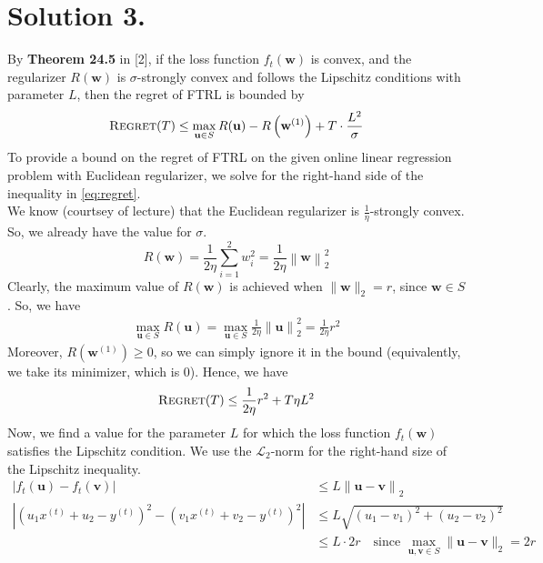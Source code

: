 \documentclass[11pt]{article}
\begin{document}
\section*{Solution 3.}
By \textbf{Theorem 24.5} in [2], if the loss function $f_{t}(\mathbf{w})$ is convex, and the
regularizer $R(\mathbf{w})$ is $\sigma$-strongly convex and follows the Lipschitz conditions
with parameter $L$, then the regret of FTRL is bounded by
\begin{equation}
    \label{eq:regret}
    \textsc{Regret}(T) \leq \max_{\mathbf{u} \in S} R(\mathbf{u}) - R \left( \mathbf{w}^{(1)} \right) + T \cdot \frac{L^{2}}{\sigma}
\end{equation}
To provide a bound on the regret of FTRL on the given online linear regression problem with
Euclidean regularizer, we solve for the right-hand side of the inequality in \eqref{eq:regret}. \\
We know (courtsey of lecture) that the Euclidean regularizer is $\frac{1}{\eta}$-strongly convex. So, we already have the
value for $\sigma$.
\begin{equation}
    R(\mathbf{w}) = \frac{1}{2\eta} \sum_{i=1}^{2} w_{i}^{2} = \frac{1}{2 \eta} \left\lVert \mathbf{w} \right\rVert_{2}^{2}
\end{equation}
Clearly, the maximum value of $R(\mathbf{w})$ is achieved when $\lVert \mathbf{w} \rVert_{2} = r$,
since $\mathbf{w} \in S$. So, we have
\begin{align}
    \max_{\mathbf{u} \in S} R(\mathbf{u}) = \max_{\mathbf{u} \in S} \frac{1}{2\eta} \left\lVert \mathbf{u} \right\rVert_{2}^{2} = \frac{1}{2\eta} r^{2}
\end{align}
Moreover, $R\left(\mathbf{w}^{(1)}\right) \geq 0$, so we can simply ignore it in the bound (equivalently,
we take its minimizer, which is 0). Hence, we have
\begin{equation}
    \label{eq:regret-bound}
    \textsc{Regret}(T) \leq \frac{1}{2\eta} r^{2} + T \eta L^{2}
\end{equation}
Now, we find a value for the parameter $L$ for which the loss function $f_{t}(\mathbf{w})$ satisfies
the Lipschitz condition. We use the $\mathcal{L}_{2}$-norm for the right-hand size of the Lipschitz inequality.
\begin{align}
    \label{eq:lipschitz}
    | f_{t}(\mathbf{u}) - f_{t}(\mathbf{v}) | &\leq L \left\lVert \mathbf{u} - \mathbf{v} \right\rVert_{2} \\
    \left| \left( u_{1} x^{(t)} + u_{2} - y^{(t)} \right)^{2} - \left( v_{1} x^{(t)} + v_{2} - y^{(t)} \right)^{2} \right| &\leq L \sqrt{(u_{1} - v_{1})^{2} + (u_{2} - v_{2})^{2}} \\
    &\leq L \cdot 2r \quad \text{since } \max_{\mathbf{u}, \mathbf{v} \in S} \lVert \mathbf{u} - \mathbf{v} \rVert_{2} = 2r
\end{align}
\end{document}
